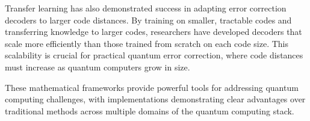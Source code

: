 Transfer learning has also demonstrated success in adapting error correction decoders to larger code distances. By training on smaller, tractable codes and transferring knowledge to larger codes, researchers have developed decoders that scale more efficiently than those trained from scratch on each code size. This scalability is crucial for practical quantum error correction, where code distances must increase as quantum computers grow in size.

These mathematical frameworks provide powerful tools for addressing quantum computing challenges, with implementations demonstrating clear advantages over traditional methods across multiple domains of the quantum computing stack. 